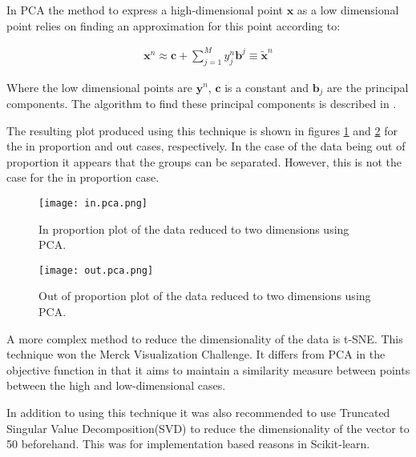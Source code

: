 In PCA the method to express a high-dimensional point $\pmb{x}$ as a low dimensional point relies on finding an approximation for this point according to\autocite[330]{barber_bayesian_2013}:

\begin{align}
    \pmb{x}^{n} \approx \pmb{c} + \sum_{j=1}^{M} y_{j}^{n} \pmb{b}^{j} \equiv \tilde{\pmb{x}}^{n}
\end{align}

Where the low dimensional points are $\pmb{y}^{n}$, $\pmb{c}$ is a constant and $\pmb{b}_{j}$ are the principal components.
The algorithm to find these principal components is described in \textcite[333]{barber_bayesian_2013}.

The resulting plot produced using this technique is shown in figures \ref{fig:inpca} and \ref{fig:outpca} for the in proportion and out cases, respectively.
In the case of the data being out of proportion it appears that the groups can be separated.
However, this is not the case for the in proportion case.

\begin{figure}
    \texttt{[image: in.pca.png]}
    \centering
    \caption{In proportion plot of the data reduced to two dimensions using PCA.}
    \label{fig:inpca}
\end{figure}

\begin{figure}
    \texttt{[image: out.pca.png]}
    \centering
    \caption{Out of proportion plot of the data reduced to two dimensions using PCA.}
    \label{fig:outpca}
\end{figure}


A more complex method to reduce the dimensionality of the data is t-SNE\autocite{van_der_maaten_visualizing_2008}.
This technique won the Merck Visualization Challenge.
It differs from PCA in the objective function in that it aims to maintain a similarity measure between points between the high and low-dimensional cases.

In addition to using this technique it was also recommended to use Truncated Singular Value Decomposition(SVD) to reduce the dimensionality of the vector to 50 beforehand.
This was for implementation based reasons in Scikit-learn.

